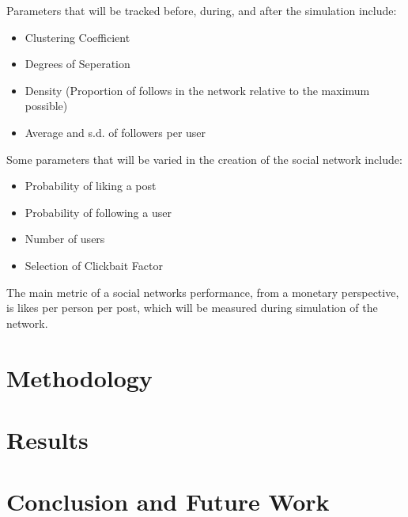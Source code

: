 \documentclass{article}
\begin{document}
Parameters that will be tracked before, during, and after the simulation include:
\begin{itemize}
    \item Clustering Coefficient
    \item Degrees of Seperation
    \item Density (Proportion of follows in the network relative to the maximum possible)
    \item Average and s.d. of followers per user
\end{itemize}

Some parameters that will be varied in the creation of the social network include:
\begin{itemize}
    \item Probability of liking a post
    \item Probability of following a user
    \item Number of users
    \item Selection of Clickbait Factor
\end{itemize}

The main metric of a social networks performance, from a monetary perspective,
is likes per person per post, which will be measured during simulation of the network.
\section{Methodology}

\section{Results}
\section{Conclusion and Future Work}
\end{document}
